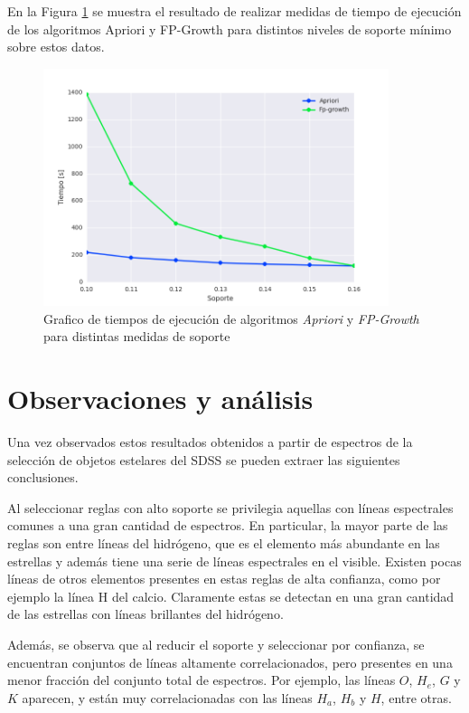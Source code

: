 En la Figura \ref{fig:complexity_support} se muestra el resultado de realizar medidas de tiempo de ejecución de los algoritmos Apriori y FP-Growth para distintos niveles de soporte mínimo sobre estos datos.

\begin{figure}[h!]
\begin{center}
\includegraphics[width=0.9\textwidth]{imagenes/complexity_support.png}
\end{center}
\vspace*{-5mm}
\caption{Grafico de tiempos de ejecución de algoritmos \textit{Apriori} y \textit{FP-Growth} para distintas medidas de soporte}
\label{fig:complexity_support}
\end{figure}

\section{Observaciones y análisis}

Una vez observados estos resultados obtenidos a partir de espectros de la selección de objetos estelares del SDSS se pueden extraer las siguientes conclusiones.

Al seleccionar reglas con alto soporte se privilegia aquellas con líneas espectrales comunes a una gran cantidad de espectros. En particular, la mayor parte de las reglas son entre líneas del hidrógeno, que es el elemento más abundante en las estrellas y además tiene una serie de líneas espectrales en el visible. Existen pocas líneas de otros elementos presentes en estas reglas de alta confianza, como por ejemplo la línea H del calcio. Claramente estas se detectan en una gran cantidad de las estrellas con líneas brillantes del hidrógeno.

Además, se observa que al reducir el soporte y seleccionar por confianza, se encuentran conjuntos de líneas altamente correlacionados, pero presentes en una menor fracción del conjunto total de espectros. Por ejemplo, las líneas $O$, $H_e$, $G$ y $K$ aparecen, y están muy correlacionadas con las líneas $H_a$, $H_b$ y $H$, entre otras.


